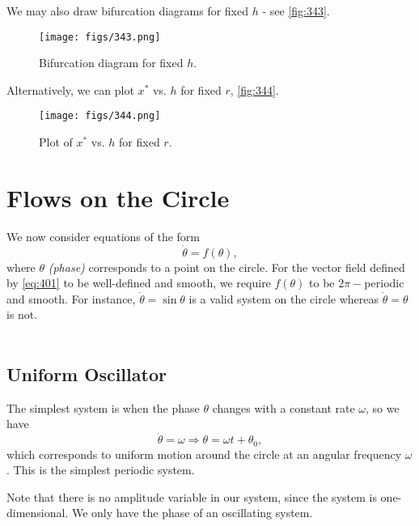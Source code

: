 \documentclass[oneside]{book}
\begin{document}
\par
We may also draw bifurcation diagrams for fixed $ h $ - see \autoref{fig:343}.
\begin{figure}[h]
	\centering
	\texttt{[image: figs/343.png]}
	\caption{Bifurcation diagram for fixed $ h $.}
	\label{fig:343}
\end{figure}
\par
Alternatively, we can plot $ x^* $ vs. $ h $ for fixed $ r $, \autoref{fig:344}.
\begin{figure}[h]
	\centering
	\texttt{[image: figs/344.png]}
	\caption{Plot of $ x^* $ vs. $ h $ for fixed $ r $.}
	\label{fig:344}
\end{figure}
\chapter{Flows on the Circle}
We now consider equations of the form
\begin{equation} \label{eq:401}
	\dot{\theta} = f(\theta),
\end{equation}
where $ \theta $ \textit{(phase)} corresponds to a point on the circle. For the vector field defined by \eqref{eq:401} to be well-defined and smooth, we require $ f(\theta) $ to be $ 2 \pi - $periodic and smooth. For instance, $ \dot{\theta} = \sin \theta $ is a valid system on the circle whereas $ \dot{\theta} = \theta $ is not.
\\\\
\section{Uniform Oscillator}
The simplest system is when the phase $ \theta $ changes with a constant rate $ \omega $, so we have
\begin{equation} \label{eq:411}
	\dot{\theta} = \omega \Rightarrow \theta = \omega t + \theta_0,
\end{equation}
which corresponds to uniform motion around the circle at an angular frequency $ \omega $. This is the simplest periodic system. 
\par
Note that there is no amplitude variable in our system, since the system is one-dimensional. We only have the phase of an oscillating system.
\end{document}
